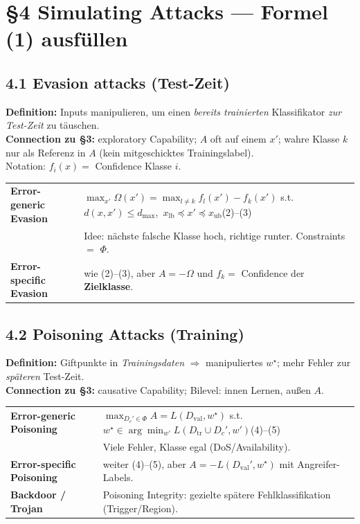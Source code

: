 \documentclass[10pt,a4paper]{article}
\begin{document}
\section{\S4 Simulating Attacks --- Formel (1) ausf\"ullen}

\subsection{4.1 Evasion attacks (Test-Zeit)}
\textbf{Definition:} Inputs manipulieren, um einen \emph{bereits trainierten} Klassifikator
\emph{zur Test-Zeit} zu t\"auschen.\\
\textbf{Connection zu §3:} exploratory Capability; $A$ oft auf einem $x'$;
wahre Klasse $k$ nur als Referenz in $A$ (kein mitgeschicktes Trainingslabel).\\
Notation: $f_i(x)=$ Confidence Klasse $i$.

\begin{tabularx}{\textwidth}{@{}>{\bfseries\small}l >{\small}X@{}}
\toprule
Error-generic Evasion &
  $\displaystyle\max_{x'} \Omega(x')=\max_{l\neq k}f_l(x')-f_k(x')$
  s.t.\ $d(x,x')\le d_{\max}$,\ $x_{\mathrm{lb}}\preceq x'\preceq x_{\mathrm{ub}}$\quad (2)--(3)\\
  & Idee: n\"achste falsche Klasse hoch, richtige runter. Constraints $=$ $\Phi$.\\
\midrule
Error-specific Evasion &
  wie (2)--(3), aber $A=-\Omega$ und $f_k=$ Confidence der \textbf{Zielklasse}.\\
\bottomrule
\end{tabularx}

\subsection{4.2 Poisoning Attacks (Training)}
\textbf{Definition:} Giftpunkte in \emph{Trainingsdaten} $\Rightarrow$ manipuliertes $w^\star$;
mehr Fehler zur \emph{sp\"ateren} Test-Zeit.\\
\textbf{Connection zu §3:} causative Capability; Bilevel: innen Lernen, au\ss{}en $A$.

\begin{tabularx}{\textwidth}{@{}>{\bfseries\small}l >{\small}X@{}}
\toprule
Error-generic Poisoning &
  $\displaystyle\max_{D_c'\in\Phi} A=L(D_{\mathrm{val}},w^\star)$
  s.t.\ $w^\star\in\arg\min_{w'} L(D_{\mathrm{tr}}\cup D_c',w')$\quad (4)--(5)\\
  & Viele Fehler, Klasse egal (DoS/Availability).\\
\midrule
Error-specific Poisoning &
  weiter (4)--(5), aber $A=-L(D_{\mathrm{val}}',w^\star)$ mit Angreifer-Labels.\\
\midrule
Backdoor / Trojan &
  Poisoning Integrity: gezielte sp\"atere Fehlklassifikation (Trigger/Region).\\
\bottomrule
\end{tabularx}
\end{document}
